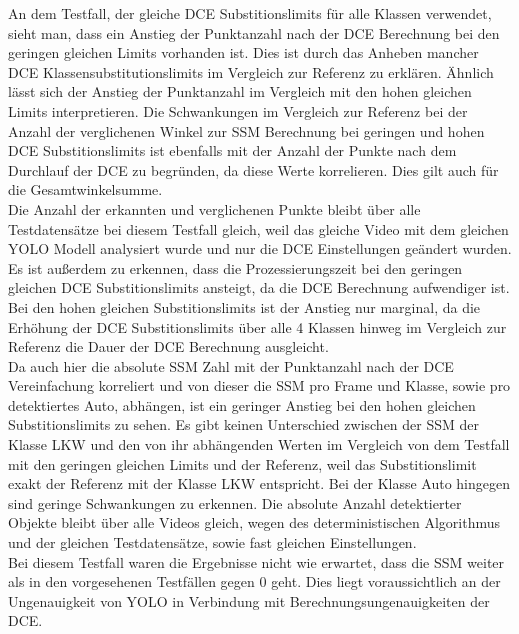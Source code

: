 {{		An dem Testfall, der gleiche DCE Substitionslimits für alle Klassen verwendet, sieht man, dass ein Anstieg der Punktanzahl nach der DCE Berechnung bei den geringen gleichen Limits vorhanden ist. Dies ist durch das Anheben mancher DCE Klassensubstitutionslimits im Vergleich zur Referenz zu erklären. Ähnlich lässt sich der Anstieg der Punktanzahl im Vergleich mit den hohen gleichen Limits interpretieren. Die Schwankungen im Vergleich zur Referenz bei der Anzahl der verglichenen Winkel zur SSM Berechnung bei geringen und hohen DCE Substitionslimits ist ebenfalls mit der Anzahl der Punkte nach dem Durchlauf der DCE zu begründen, da diese Werte korrelieren. Dies gilt auch für die Gesamtwinkelsumme. \\
		Die Anzahl der erkannten und verglichenen Punkte bleibt über alle Testdatensätze bei diesem Testfall gleich, weil das gleiche Video mit dem gleichen YOLO Modell analysiert wurde und nur die DCE Einstellungen geändert wurden. Es ist außerdem zu erkennen, dass die Prozessierungszeit bei den geringen gleichen DCE Substitionslimits ansteigt, da die DCE Berechnung aufwendiger ist. Bei den hohen gleichen Substitionslimits ist der Anstieg nur marginal, da die Erhöhung der DCE Substitionslimits über alle 4 Klassen hinweg im Vergleich zur Referenz die Dauer der DCE Berechnung ausgleicht. \\
		Da auch hier die absolute SSM Zahl mit der Punktanzahl nach der DCE Vereinfachung korreliert und von dieser die SSM pro Frame und Klasse, sowie pro detektiertes Auto, abhängen, ist ein geringer Anstieg bei den hohen gleichen Substitionslimits zu sehen. Es gibt keinen Unterschied zwischen der SSM der Klasse LKW und den von ihr abhängenden Werten im Vergleich von dem Testfall mit den geringen gleichen Limits und der Referenz, weil das Substitionslimit exakt der Referenz mit der Klasse LKW entspricht. Bei der Klasse Auto hingegen sind geringe Schwankungen zu erkennen. Die absolute Anzahl detektierter Objekte bleibt über alle Videos gleich, wegen des deterministischen Algorithmus und der gleichen Testdatensätze, sowie fast gleichen Einstellungen. \\
		Bei diesem Testfall waren die Ergebnisse nicht wie erwartet, dass die SSM weiter als in den vorgesehenen Testfällen gegen 0 geht. Dies liegt voraussichtlich an der Ungenauigkeit von YOLO in Verbindung mit Berechnungsungenauigkeiten der DCE. \\

}}
